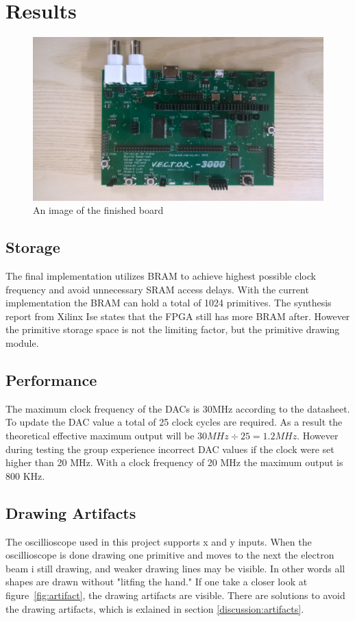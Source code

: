 \chapter{Results}

\begin{figure}[h!]
	    \includegraphics[width=\linewidth, angle=180]{images/board.jpg}
	    \caption{An image of the finished \vthreek board}
	    \label{fig:board}
\end{figure}

\section{Storage}
The final implementation utilizes BRAM to achieve highest possible clock frequency and avoid unnecessary SRAM access delays.
With the current implementation the BRAM can hold a total of 1024 primitives.
The synthesis report from Xilinx Ise states that the FPGA still has more BRAM after.
However the primitive storage space is not the limiting factor, but the primitive drawing module.

\section{Performance}
The maximum clock frequency of the DACs is 30MHz according to the datasheet.
To update the DAC value a total of 25 clock cycles are required.
As a result the theoretical effective maximum output will be \(30 MHz \div 25 = 1.2 MHz \).
However during testing the group experience incorrect DAC values if the clock were set higher than 20 MHz.
With a clock frequency of 20 MHz the maximum output is 800 KHz.

\section{Drawing Artifacts}
\label{results:artifacts}
The oscillioscope used in this project supports x and y inputs.
When the oscillioscope is done drawing one primitive and moves to the next the electron beam i still drawing,
and weaker drawing lines may be visible.
In other words all shapes are drawn without "litfing the hand."
If one take a closer look at figure~\ref{fig:artifact}, the drawing artifacts are visible.
There are solutions to avoid the drawing artifacts, which is exlained in section \ref{discussion:artifacts}.



